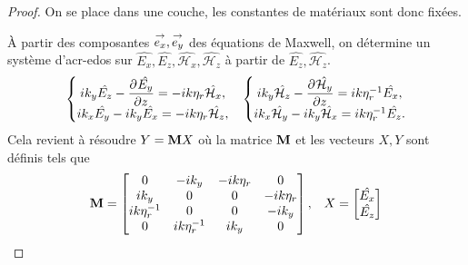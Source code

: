       \begin{proof}
        On se place dans une couche, les constantes de matériaux sont donc fixées.

        À partir des composantes \(\vect{e_x},\vect{e_y}\) des équations de Maxwell, on  détermine un système d'\glspl{acr-edo} sur \(\hat{E_x},\hat{E_z},\hat{\mathcal{H}_x},\hat{\mathcal{H}_z}\) à partir de \(\hat{E_z}, \hat{\mathcal{H}_z}\).
        \begin{align*}
            \left\lbrace
            \begin{matrix}
              ik_y \hat{E_z}  - \ddr{z}{\hat{E_y}} = -i k \eta_r  \hat{\mathcal{H}_x},
              \\
              ik_x \hat{E_y} - ik_y \hat{E_x} = -i k \eta_r  \hat{\mathcal{H}_z},
            \end{matrix}
            \right. 
            &&
            \left\lbrace
            \begin{matrix}
              ik_y \hat{\mathcal{H}_z}  - \ddr{z}{\hat{\mathcal{H}_y}} = i k \eta_r^{-1} \hat{E_x},
              \\
              ik_x \hat{\mathcal{H}_y} - ik_y \hat{\mathcal{H}_x} = i k \eta_r^{-1} \hat{E_z}.
            \end{matrix}
            \right.
        \end{align*}
        Cela revient à résoudre \(Y = \mat{M}X\) où la matrice \(\mat{M}\) et les vecteurs \(X, Y\) sont définis tels que
        \begin{align*}
          \mat{M} =
          \begin{bmatrix}
          0 & -ik_y & -ik \eta_r & 0
          \\
          ik_y & 0 & 0 & -ik \eta_r
          \\
          ik \eta_r^{-1} & 0 & 0 & -ik_y
          \\
          0 & ik \eta_r^{-1} & ik_y & 0
          \end{bmatrix},
          &&
          X =
          \begin{bmatrix}
            \hat{E_x}\\
            \hat{E_z}\\

\end{bmatrix}
\end{align*}
\end{proof}
